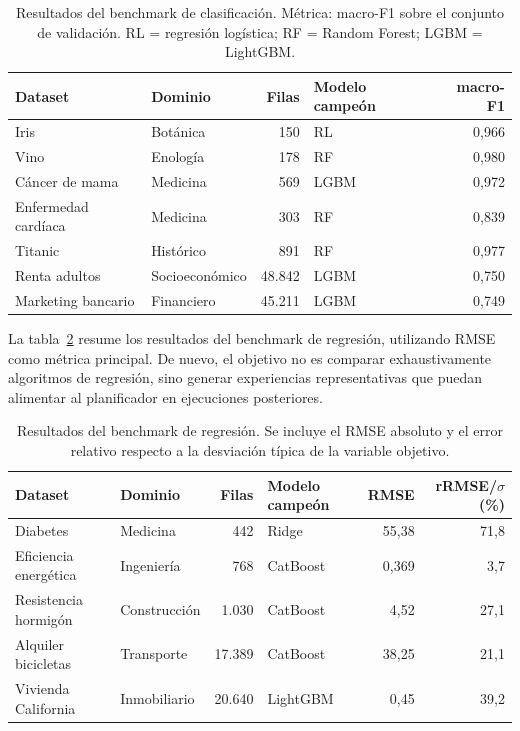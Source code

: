 \documentclass[12pt,a4paper]{article}
\theoremstyle{plain}
\begin{document}
\begin{table}[H]
\centering
\small
\begin{tabular}{llrlr}
\hline
\textbf{Dataset} & \textbf{Dominio} & \textbf{Filas} & \textbf{Modelo campeón} & \textbf{macro-F1} \\\hline
Iris                & Botánica       & 150    & RL & 0,966 \\\hline
Vino                & Enología       & 178    & RF    & 0,980 \\\hline
Cáncer de mama      & Medicina       & 569    & LGBM            & 0,972 \\\hline
Enfermedad cardíaca & Medicina       & 303    & RF    & 0,839 \\\hline
Titanic             & Histórico      & 891    & RF    & 0,977 \\\hline
Renta adultos       & Socioeconómico & 48.842 & LGBM            & 0,750 \\\hline
Marketing bancario  & Financiero     & 45.211 & LGBM            & 0,749 \\\hline
\end{tabular}
\caption{Resultados del benchmark de clasificación. Métrica: macro-F1 sobre el conjunto de validación. RL = regresión logística; RF = Random Forest; LGBM = LightGBM.}
\label{tab:pool-classification}
\end{table}

La tabla~\ref{tab:pool-regression} resume los resultados del benchmark de regresión, utilizando RMSE como métrica principal. De nuevo, el objetivo no es comparar exhaustivamente algoritmos de regresión, sino generar experiencias representativas que puedan alimentar al planificador en ejecuciones posteriores.

\begin{table}[H]
\centering
\small
\begin{tabular}{llrlrr}
\hline
\textbf{Dataset} & \textbf{Dominio} & \textbf{Filas} & \textbf{Modelo campeón} & \textbf{RMSE} & \textbf{rRMSE/$\sigma$ (\%)} \\\hline
Diabetes              & Medicina     & 442    & Ridge    & 55,38 & 71,8 \\\hline
Eficiencia energética & Ingeniería   & 768    & CatBoost    & 0,369  & 3,7 \\\hline
Resistencia hormigón  & Construcción & 1.030  & CatBoost & 4,52  & 27,1 \\\hline
Alquiler bicicletas   & Transporte   & 17.389 & CatBoost & 38,25 & 21,1 \\\hline
Vivienda California   & Inmobiliario & 20.640 & LightGBM & 0,45  & 39,2 \\\hline
\end{tabular}
\caption{Resultados del benchmark de regresión. Se incluye el RMSE absoluto y el error relativo respecto a la desviación típica de la variable objetivo.}
\label{tab:pool-regression}
\end{table}
\end{document}
